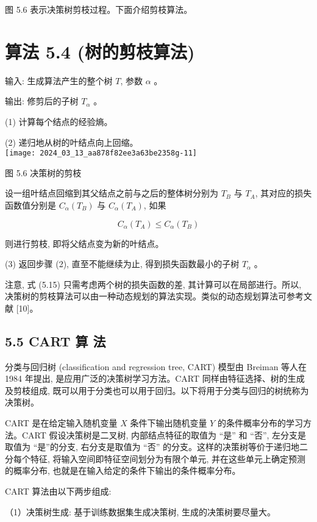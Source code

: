 \documentclass[10pt]{article}
\begin{document}
\begin{CJK*}{UTF8}{bsmi}
图 5.6 表示决策树剪枝过程。下面介绍剪枝算法。

\section*{算法 5.4 (树的剪枝算法)}
输入: 生成算法产生的整个树 $T$, 参数 $\alpha$ 。

输出: 修剪后的子树 $T_{\alpha}$ 。

(1) 计算每个结点的经验熵。

(2) 递归地从树的叶结点向上回缩。\\
\texttt{[image: 2024\_03\_13\_aa878f82ee3a63be2358g-11]}

图 5.6 决策树的剪枝

设一组叶结点回缩到其父结点之前与之后的整体树分别为 $T_{B}$ 与 $T_{A}$, 其对应的损失函数值分别是 $C_{\alpha}\left(T_{B}\right)$ 与 $C_{\alpha}\left(T_{A}\right)$, 如果


\begin{equation*}
C_{\alpha}\left(T_{A}\right) \leqslant C_{\alpha}\left(T_{B}\right) \tag{5.15}
\end{equation*}


则进行剪枝, 即将父结点变为新的叶结点。

(3) 返回步骤 (2), 直至不能继续为止, 得到损失函数最小的子树 $T_{\alpha}$ 。

注意, 式 (5.15) 只需考虑两个树的损失函数的差, 其计算可以在局部进行。所以, 决策树的剪枝算法可以由一种动态规划的算法实现。类似的动态规划算法可参考文献 [10]。

\subsection*{5.5 CART 算 法}
分类与回归树 (classification and regression tree, CART) 模型由 Breiman 等人在 1984 年提出, 是应用广泛的决策树学习方法。CART 同样由特征选择、树的生成及剪枝组成, 既可以用于分类也可以用于回归。以下将用于分类与回归的树统称为决策树。

CART 是在给定输入随机变量 $X$ 条件下输出随机变量 $Y$ 的条件概率分布的学习方法。CART 假设决策树是二叉树, 内部结点特征的取值为 “是” 和 “否”, 左分支是取值为 “是”的分支, 右分支是取值为 “否” 的分支。这样的决策树等价于递归地二分每个特征, 将输入空间即特征空间划分为有限个单元, 并在这些单元上确定预测的概率分布, 也就是在输入给定的条件下输出的条件概率分布。

CART 算法由以下两步组成:

（1）决策树生成: 基于训练数据集生成决策树, 生成的决策树要尽量大。


\end{CJK*}
\end{document}
